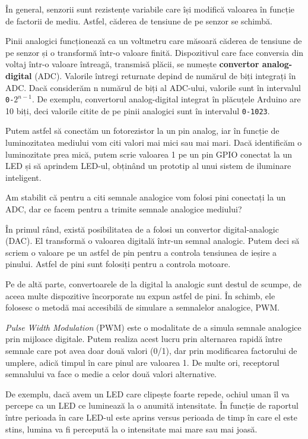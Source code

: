 În general, senzorii sunt rezistențe variabile care își modifică valoarea în
funcție de factorii de mediu. Astfel, căderea de tensiune de pe senzor se
schimbă.

Pinii analogici funcționează ca un voltmetru care măsoară căderea de tensiune de
pe senzor și o transformă într-o valoare finită. Dispozitivul care face
conversia din voltaj într-o valoare întreagă, transmisă plăcii, se numește
\textbf{convertor analog-digital} (ADC). Valorile întregi returnate depind de numărul de
biți integrați în ADC. Dacă considerăm n numărul de biți al ADC-ului, valorile
sunt în intervalul \texttt{0-$2^{n-1}$}. De exemplu, convertorul analog-digital integrat
în plăcuțele Arduino are 10 biți, deci valorile citite de pe pinii analogici
sunt în intervalul \texttt{0-1023}.

Putem astfel să conectăm un fotorezistor la un pin analog, iar în funcție de
luminozitatea mediului vom citi valori mai mici sau mai mari. Dacă identificăm o
luminozitate prea mică, putem scrie valoarea 1 pe un pin GPIO conectat la un LED
și să aprindem LED-ul, obținând un prototip al unui sistem de iluminare
inteligent.

Am stabilit că pentru a citi semnale analogice vom folosi pini conectați la un
ADC, dar ce facem pentru a trimite semnale analogice mediului?

În primul rând, există posibilitatea de a folosi un convertor digital-analogic
(DAC). El transformă o valoarea digitală într-un semnal analogic. Putem deci să
scriem o valoare pe un astfel de pin pentru a controla tensiunea de ieșire a
pinului. Astfel de pini sunt folosiți pentru a controla motoare.

Pe de altă parte, convertoarele de la digital la analogic sunt destul de scumpe,
de aceea multe dispozitive încorporate nu expun astfel de pini. În schimb, ele
folosesc o metodă mai accesibilă de simulare a semnalelor analogice, PWM.

\textit{Pulse Width Modulation} (PWM) este o modalitate de a simula semnale analogice
prin mijloace digitale. Putem realiza acest lucru prin alternarea rapidă între
semnale care pot avea doar două valori (0/1), dar prin modificarea factorului de
umplere, adică timpul în care pinul are valoarea 1. De multe ori, receptorul
semnalului va face o medie a celor două valori alternative.

De exemplu, dacă avem un LED care clipește foarte repede, ochiul uman îl va
percepe ca un LED ce luminează la o anumită intensitate. În funcție de raportul
între perioada în care LED-ul este aprins versus perioada de timp în care el
este stins, lumina va fi percepută la o intensitate mai mare sau mai joasă.

